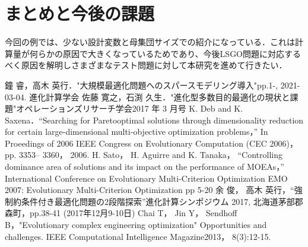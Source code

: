 \documentclass[11pt,a4j,notitlepage]{jsarticle}
\begin{document}
\section{まとめと今後の課題}
\vspace{-1.0zh}
今回の例では、少ない設計変数と母集団サイズでの紹介になっている．これは計算量が何らかの原因で大きくなっているためであり、今後LSGO問題に対応するべく原因を解明しさまざまなテスト問題に対して本研究を進めて行きたい．
\vspace{-1.0zh}
\begin{thebibliography}{99}
  {\fontsize{10pt}{10pt}\selectfont
{}鐘 睿，高木 英行．"大規模最適化問題へのスパースモデリング導入"pp.1-, 2021-03-04. 進化計算学会
佐藤 寛之，石渕 久生．"進化型多数目的最適化の現状と課題"オペレーションズリサーチ学会2017 年 3 月号
K. Deb and K. Saxena．“Searching for Paretooptimal solutions through dimensionality reduction for
certain large-dimensional multi-objective optimization
problems，” In Proeedings of 2006 IEEE Congress on
Evolutionary Computation (CEC 2006)， pp. 3353–
3360， 2006.
H. Sato， H. Aguirre and K. Tanaka， “Controlling
dominance area of solutions and its impact on the performance of MOEAs，” International Conference on Evolutionary Multi-Criterion Optimization
EMO 2007: Evolutionary Multi-Criterion Optimization pp 5-20
余 俊， 高木 英行，“強制約条件付き最適化問題の2段階探索”進化計算シンポジウム 2017, 北海道茅部郡森町，pp.38-41 (2017年12月9-10日)
Chai T， Jin Y， Sendhoff B，"Evolutionary complex
engineering optimization" Opportunities and challenges. IEEE Computational Intelligence Magazine2013， 8(3):12-15.
}
\end{thebibliography}
\end{document}
